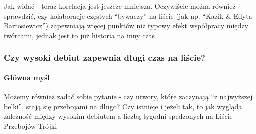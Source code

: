 \documentclass[11pt]{article}
\begin{document}
    Jak widać - teraz korelacja jest jeszcze mniejsza. Oczywiście można
również sprawdzić, czy kolaboracje częstych ``bywaczy'' na liście (jak
np. ``Kazik \& Edyta Bartosiewicz'') zapewniają więcej punktów niż
typowy efekt współpracy między twórcami, jednak jest to już historia na
inny czas

    \hypertarget{czy-wysoki-debiut-zapewnia-dux142ugi-czas-na-liux15bcie}{%
\subsubsection{Czy wysoki debiut zapewnia długi czas na
liście?}\label{czy-wysoki-debiut-zapewnia-dux142ugi-czas-na-liux15bcie}}

\hypertarget{gux142uxf3wna-myux15bl}{%
\paragraph{Główna myśl}\label{gux142uxf3wna-myux15bl}}

Możemy również zadać sobie pytanie - czy utwory, które zaczynają ``z
najwyższej belki'', stają się przebojami na długo? Czy istnieje i jeżeli
tak, to jak wygląda zależność między wysokim debiutem a liczbą tygodni
spędzonych na Liście Przebojów Trójki
\end{document}
